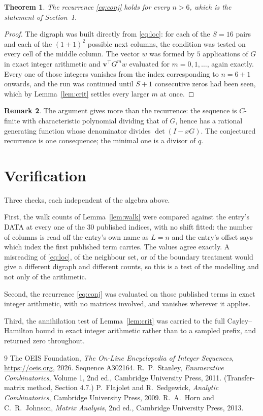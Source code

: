 \documentclass[11pt,a4paper]{article}
\theoremstyle{plain}
\newtheorem{theorem}{Theorem}
\theoremstyle{definition}
\newtheorem{remark}[theorem]{Remark}
\begin{document}
\begin{theorem}
The recurrence \eqref{eq:conj} holds for every $n>6$, which is the statement of
Section~1.
\end{theorem}

\begin{proof}
The digraph was built directly from \eqref{eq:loc}: for each of the $S=16$ pairs and each
of the $(1+1)^{2}$ possible next columns, the condition was tested on every cell of
the middle column. The vector $w$ was formed by $5$ applications of $G$ in exact integer
arithmetic and $\mathbf{v}^{\!\top}G^{m}w$ evaluated for $m=0,1,\dots$, again exactly.
Every one of those integers vanishes from the index corresponding to $n=6+1$ onwards,
and the run was continued until $S+1$ consecutive zeros had been seen, which by
Lemma~\ref{lem:crit} settles every larger $m$ at once.
\end{proof}

\begin{remark}
The argument gives more than the recurrence: the sequence is $C$-finite with characteristic
polynomial dividing that of $G$, hence has a rational generating function whose denominator
divides $\det(I-xG)$. The conjectured recurrence is one consequence; the minimal one is a
divisor of $q$.
\end{remark}

\section{Verification}

Three checks, each independent of the algebra above.

First, the walk counts of Lemma~\ref{lem:walk} were compared against the entry's DATA at
every one of the $30$ published indices, with no shift fitted: the number of columns is
read off the entry's own name as $L=n$ and the entry's offset says which index the first
published term carries. The values agree exactly. A misreading of \eqref{eq:loc}, of the
neighbour set, or of the boundary treatment would give a different digraph and different
counts, so this is a test of the modelling and not only of the arithmetic.

Second, the recurrence \eqref{eq:conj} was evaluated on those published terms in exact
integer arithmetic, with no matrices involved, and vanishes wherever it applies.

Third, the annihilation test of Lemma~\ref{lem:crit} was carried to the full
Cayley--Hamilton bound in exact integer arithmetic rather than to a sampled prefix, and
returned zero throughout.

\begin{thebibliography}{9}
 The OEIS Foundation, \emph{The On-Line Encyclopedia of Integer
Sequences}, \url{https://oeis.org}, 2026. Sequence A302164.
 R.~P.~Stanley, \emph{Enumerative Combinatorics}, Volume 1, 2nd ed.,
Cambridge University Press, 2011. (Transfer-matrix method, Section 4.7.)
 P.~Flajolet and R.~Sedgewick, \emph{Analytic Combinatorics}, Cambridge
University Press, 2009.
 R.~A.~Horn and C.~R.~Johnson, \emph{Matrix Analysis}, 2nd ed., Cambridge
University Press, 2013.
\end{thebibliography}
\end{document}
